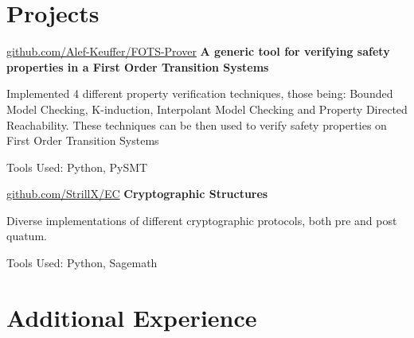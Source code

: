 \documentclass[10pt, letterpaper]{article}
\begin{document}
    
    \section{Projects}



        
        \begin{twocolentry}{
            \href{https://github.com/Alef-Keuffer/FOTS-Prover}{github.com/Alef-Keuffer/FOTS-Prover}
        }
            \textbf{A generic tool for verifying safety properties in a First Order Transition Systems}\end{twocolentry}

        \vspace{0.10 cm}
        \begin{onecolentry}
            \begin{highlights}
                \item Implemented 4 different property verification techniques, those being: Bounded Model Checking, K-induction, Interpolant Model Checking and Property Directed Reachability. These techniques can be then used to verify safety properties on First Order Transition Systems
                \item Tools Used: Python, PySMT
            \end{highlights}
        \end{onecolentry}


        \vspace{0.2 cm}

        \begin{twocolentry}{
            \href{https://github.com/StrillX/EC}{github.com/StrillX/EC}
        }
            \textbf{Cryptographic Structures}\end{twocolentry}

        \vspace{0.10 cm}
        \begin{onecolentry}
            \begin{highlights}
                \item Diverse implementations of different cryptographic protocols, both pre and post quatum.
                \item Tools Used: Python, Sagemath
            \end{highlights}
        \end{onecolentry}


    
    \section{Additional Experience}
\end{document}
